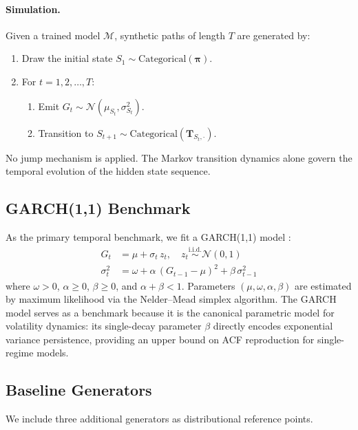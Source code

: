 \paragraph{Simulation.}
Given a trained model $\mathcal{M}$, synthetic paths of length $T$ are generated by:
\begin{enumerate}
    \item Draw the initial state $S_1 \sim \text{Categorical}(\boldsymbol{\pi})$.
    \item For $t = 1, 2, \ldots, T$:
    \begin{enumerate}
        \item Emit $G_t \sim \mathcal{N}(\mu_{S_t}, \sigma_{S_t}^2)$.
        \item Transition to $S_{t+1} \sim \text{Categorical}(\mathbf{T}_{S_t, \cdot})$.
    \end{enumerate}
\end{enumerate}
No jump mechanism is applied.
The Markov transition dynamics alone govern the temporal evolution of the hidden state sequence.

\subsection{GARCH(1,1) Benchmark}
\label{sec:garch}

As the primary temporal benchmark, we fit a GARCH(1,1) model \cite{bollerslev1986generalized}:
\begin{align}
    G_t &= \mu + \sigma_t\, z_t, \quad z_t \overset{\text{i.i.d.}}{\sim} \mathcal{N}(0,1) \label{eq:garch_mean} \\
    \sigma_t^2 &= \omega + \alpha\, (G_{t-1} - \mu)^2 + \beta\, \sigma_{t-1}^2 \label{eq:garch_var}
\end{align}
where $\omega > 0$, $\alpha \geq 0$, $\beta \geq 0$, and $\alpha + \beta < 1$.
Parameters $(\mu, \omega, \alpha, \beta)$ are estimated by maximum likelihood via the Nelder--Mead simplex algorithm.
The GARCH model serves as a benchmark because it is the canonical parametric model for volatility dynamics: its single-decay parameter $\beta$ directly encodes exponential variance persistence, providing an upper bound on ACF reproduction for single-regime models.

\subsection{Baseline Generators}
\label{sec:baselines}

We include three additional generators as distributional reference points.

